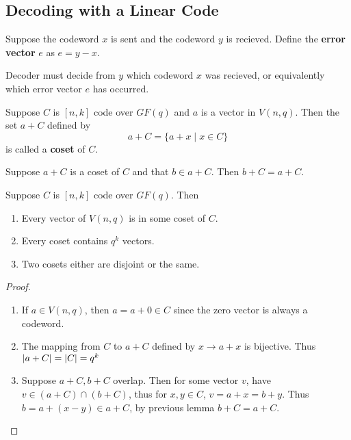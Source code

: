 \documentclass{article}
\begin{document}
\subsection{Decoding with a Linear Code}
\begin{definition}
  Suppose the codeword \( x \) is sent and the codeword \( y \) is
  recieved. Define the \textbf{error vector} \( e \) as \( e = y-x \).
\end{definition}
\begin{remark}
  Decoder must decide from \( y \) which codeword \( x \) was recieved, or equivalently which error vector \( e \) has occurred.
\end{remark}
\begin{definition}
  Suppose \( C \) is \( [n, k] \) code over \( GF(q) \) and \( a \) is a vector in \( V(n, q) \). Then the set \( a + C \) defined by \[
    a + C = \{ a + x \mid x \in C \}
  \] is called a \textbf{coset} of \( C \).
\end{definition}
\begin{lemma}
  Suppose \( a+C \) is a coset of \( C \) and that \( b \in a + C \). Then \( b + C = a + C \).
\end{lemma}
\begin{theorem}
  Suppose \( C \) is \( [n, k] \) code over \( GF(q) \). Then \begin{enumerate}
    \item Every vector of \( V(n, q) \) is in some coset of \( C \).
    \item Every coset contains \( q^k \) vectors.
    \item Two cosets either are disjoint or the same.
  \end{enumerate}
\end{theorem}
\begin{proof}
  \begin{enumerate}
    \item If \( a \in V(n, q) \), then \( a = a + 0 \in C \) since the zero vector is always a codeword.
    \item The mapping from \( C \) to \( a + C \) defined by \( x \to a + x \) is bijective. Thus \( \abs{a+C} = \abs{C} = q^k   \)
    \item Suppose \( a+C, b+C \) overlap. Then for some vector \( v \), have \( v \in (a + C) \cap (b+C) \), thus for \( x,y \in C \), \( v = a + x = b +y \). Thus \( b = a + (x- y) \in a + C \), by previous lemma \( b + C = a + C\).
  \end{enumerate}
\end{proof}
\end{document}
